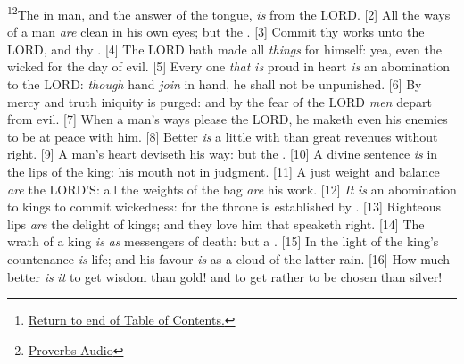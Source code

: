 \footnote{\textcolor[cmyk]{0.99998,1,0,0}{\hyperlink{TOC}{Return to end of Table of Contents.}}}\footnote{\href{https://www.audioverse.org/english/audiobibles/books/ENGKJV/O/Prov/1}{\textcolor[cmyk]{0.99998,1,0,0}{Proverbs Audio}}}\textcolor[cmyk]{0.99998,1,0,0}{The  in man, and the answer of the tongue, \emph{is} from the LORD.}
[2] \textcolor[cmyk]{0.99998,1,0,0}{All the ways of a man \emph{are} clean in his own eyes; but the    .}
[3] \textcolor[cmyk]{0.99998,1,0,0}{Commit thy works unto the LORD, and thy  .}
[4] \textcolor[cmyk]{0.99998,1,0,0}{The LORD hath made all \emph{things} for himself: yea, even the wicked for the day of evil.}
[5] \textcolor[cmyk]{0.99998,1,0,0}{Every one \emph{that} \emph{is} proud in heart \emph{is} an abomination to the LORD: \emph{though} hand \emph{join} in hand, he shall not be unpunished.}
[6] \textcolor[cmyk]{0.99998,1,0,0}{By mercy and truth iniquity is purged: and by the fear of the LORD \emph{men} depart from evil.}
[7] \textcolor[cmyk]{0.99998,1,0,0}{When a man's ways please the LORD, he maketh even his enemies to be at peace with him.}
[8] \textcolor[cmyk]{0.99998,1,0,0}{Better \emph{is} a little with  than great revenues without right.}
[9] \textcolor[cmyk]{0.99998,1,0,0}{A man's heart deviseth his way: but the .}
[10] \textcolor[cmyk]{0.99998,1,0,0}{A divine sentence \emph{is} in the lips of the king: his mouth  not in judgment.}
[11] \textcolor[cmyk]{0.99998,1,0,0}{A just weight and balance \emph{are} the LORD'S: all the weights of the bag \emph{are} his work.}
[12] \textcolor[cmyk]{0.99998,1,0,0}{\emph{It} \emph{is} an abomination to kings to commit wickedness: for the throne is established by .}
[13] \textcolor[cmyk]{0.99998,1,0,0}{Righteous lips \emph{are} the delight of kings; and they love him that speaketh right.}
[14] \textcolor[cmyk]{0.99998,1,0,0}{The wrath of a king \emph{is} \emph{as} messengers of death: but a .}
[15] \textcolor[cmyk]{0.99998,1,0,0}{In the light of the king's countenance \emph{is} life; and his favour \emph{is} as a cloud of the latter rain.}
[16] \textcolor[cmyk]{0.99998,1,0,0}{How much better \emph{is} \emph{it} to get wisdom than gold! and to get  rather to be chosen than silver!}
